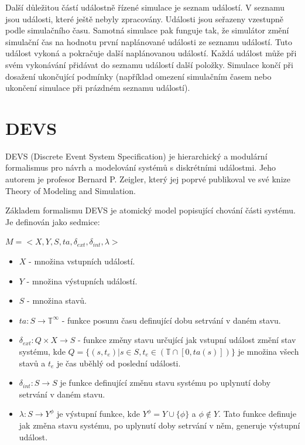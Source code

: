 Další důležitou částí událostně řízené simulace je seznam událostí. V seznamu jsou události, které ještě nebyly zpracovány. Události jsou seřazeny
vzestupně podle simulačního času. Samotná simulace pak funguje tak, že simulátor změní simulační čas na hodnotu první naplánované události ze seznamu událostí. Tuto událost vykoná a pokračuje další naplánovanou událostí. Každá událost může při svém vykonávání přidávat do seznamu událostí další položky. Simulace končí při dosažení ukončující podmínky (například omezení simulačním časem nebo ukončení simulace při prázdném seznamu událostí).

\section{DEVS}

DEVS (Discrete Event System Specification) je hierarchický a modulární formalismus pro návrh a modelování systémů s diskrétními událostmi. Jeho autorem je profesor Bernard P. Zeigler, který jej poprvé publikoval ve své knize Theory of Modeling and Simulation.

Základem formalismu DEVS je atomický model popisující chování části systému. Je definován jako sedmice:

\begin{math}
M=<X,Y,S,ta, \delta_{ext}, \delta_{int}, \lambda>
\end{math}

\begin{itemize}
\item $X$ - množina vstupních událostí.
\item $Y$ - množina výstupních událostí.
\item $S$ - množina stavů.
\item $ta:S \rightarrow \mathbb{T}^\infty$ - funkce posunu času definující dobu setrvání v daném stavu.
\item $\delta_{ext}:Q \times X \rightarrow  S$ - funkce změny stavu určující jak vstupní událost změní stav systému, kde $Q=\{(s,t_e)|s \in S, t_e \in (\mathbb{T} \cap [0, ta(s)])\}$ je množina všech stavů a $t_e$ je čas uběhlý od poslední události.
\item $\delta_{int}:S \rightarrow S$ je funkce definující změnu stavu systému po uplynutí doby setrvání v daném stavu.
\item $\lambda:S \rightarrow  Y^\phi$ je výstupní funkce, kde $Y^\phi=Y \cup \{\phi\}$ a $\phi \not\in Y$. Tato funkce definuje jak změna stavu systému, po uplynutí doby setrvání v něm, generuje výstupní událost.
\end{itemize}

